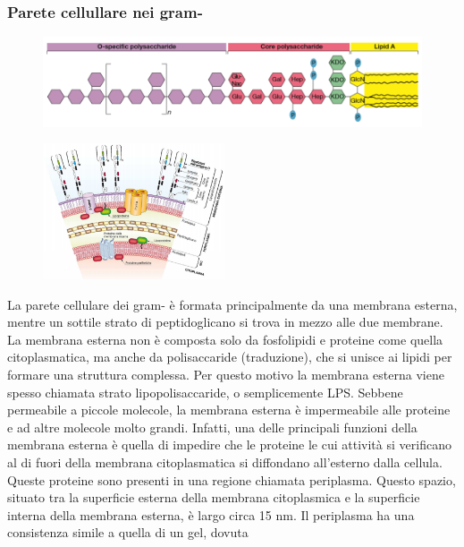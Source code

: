 \subsubsection{Parete cellullare nei gram-}
\begin{figure}[H]
	\includegraphics[width=\textwidth]{Pictures/5.png}
\end{figure} 
\newpage
\begin{figure}
  \begin{center}
    \includegraphics[width=0.48\textwidth]{Pictures/6.png}
  \end{center}
\end{figure}
La parete cellulare dei gram- è formata principalmente da una membrana esterna, mentre un sottile strato di peptidoglicano si trova in mezzo alle due 
membrane. La membrana esterna non è composta solo da fosfolipidi e proteine come quella citoplasmatica, ma anche da polisaccaride (traduzione), che si 
unisce ai lipidi per formare una struttura complessa. Per questo motivo la membrana esterna viene spesso chiamata strato lipopolisaccaride, o semplicemente 
LPS. Sebbene permeabile a piccole molecole, la membrana esterna è impermeabile alle proteine e ad altre molecole molto grandi. Infatti, una delle principali 
funzioni della membrana esterna è quella di impedire che le proteine le cui attività si verificano al di fuori della membrana citoplasmatica si diffondano 
all’esterno dalla cellula. Queste proteine sono presenti in una regione chiamata periplasma. Questo spazio, situato tra la superficie esterna della membrana 
citoplasmica e la superficie interna della membrana esterna, è largo circa 15 nm. Il periplasma ha una consistenza simile a quella di un gel, dovuta 
